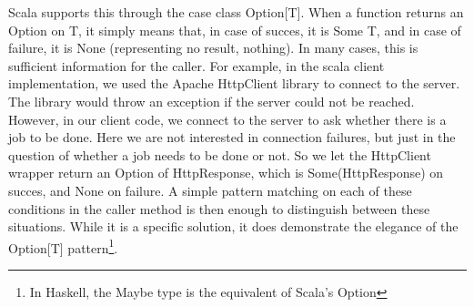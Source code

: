 Scala supports this through the case class Option[T]. When a function returns an Option on T,
it simply means that, in case of succes, it is Some T, and in case of failure, it is
None (representing no result, nothing). In many cases, this is sufficient information
for the caller. For example, in the scala client implementation, we used the Apache HttpClient
library \cite{HttpClient} to connect to the server. The library would throw an exception if
the server could not be reached. However, in our client code, we connect to the server
to ask whether there is a job to be done. Here we are not interested in connection failures,
but just in the question of whether a job needs to be done or not. So we let the HttpClient
wrapper return an Option of HttpResponse, which is Some(HttpResponse) on succes, and None
on failure. A simple pattern matching on each of these conditions in the caller method is then 
enough to distinguish between these situations. While it is a specific solution, it does
demonstrate the elegance of the Option[T] pattern\footnote{In Haskell, the Maybe type is the equivalent of Scala's Option}.
